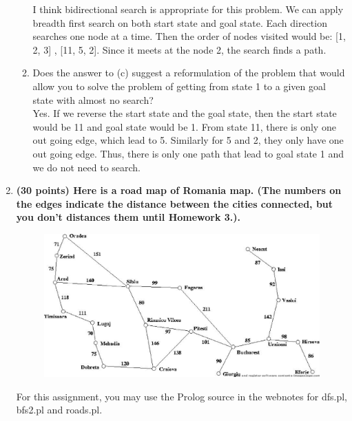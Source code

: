\documentclass{article}%
\begin{document}
\begin{enumerate}
\begin{enumerate}
	I think bidirectional search is appropriate for this problem. We can apply breadth first search on both start state and goal state. Each direction searches one node at a time. Then the order of nodes visited would be: [1, 2, 3] , [11, 5, 2]. Since it meets at the node 2, the search finds a path.
	
	\item Does the answer to (c) suggest a reformulation of the problem that would allow you to
solve the problem of getting from state 1 to a given goal state with almost no search? \\

     Yes. If we reverse the start state and the goal state, then the start state would be 11 and goal state would be 1. From state 11, there is only one out going edge, which lead to 5. Similarly for 5 and 2, they only have one out going edge. Thus, there is only one path that lead to goal state 1 and we do not need to search.

\end{enumerate}
	
\item \textbf{(30 points) Here is a road map of Romania map. (The numbers on the edges indicate the distance between the cities connected, but you don't distances them until Homework 3.).}

\begin{figure}[h]
\centering
\includegraphics[scale=0.45, clip]{romania.eps} 
\vspace*{-2ex}
\end{figure}

For this assignment, you may use the Prolog source in the webnotes for dfs.pl, bfs2.pl and roads.pl. 


\end{enumerate}
\end{document}
